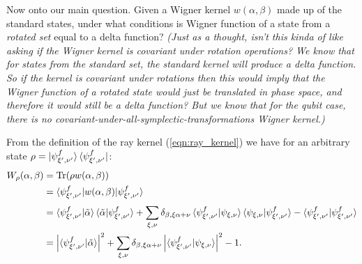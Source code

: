 \documentclass[a4paper]{article}
\DeclareMathOperator{\Tr}{Tr}
\begin{document}
  Now onto our main question. Given a Wigner kernel
  $w(\alpha,\beta)$ made up of the standard states, under
  what conditions is Wigner function of a state from a
  \textit{rotated set} equal to a delta function?
  \textit{(Just as a thought, isn't this kinda of like
    asking if the Wigner kernel is covariant under rotation
    operations? We know that for states from the standard
    set, the standard kernel will produce a delta function.
    So if the kernel is covariant under rotations then this
    would imply that the Wigner function of a rotated state
    would just be translated in phase space, and therefore
    it would still be a delta function? But we know that for
    the qubit case, there is no
  covariant-under-all-symplectic-transformations
  Wigner kernel.)}

  From the definition of the ray kernel
  (\ref{eqn:ray_kernel}) we have for an arbitrary state
  $\rho = \ket{\psi_{\xi',\nu'}^f}
  \bra{\psi_{\xi',\nu'}^f}$:
  \begin{align}
    W_\rho(\alpha,\beta)
    &= \Tr(\rho w(\alpha,\beta)) \\
    &=
    \braket{
      \psi_{\xi',\nu'}^f|w(\alpha,\beta)|\psi_{\xi',\nu'}^f
    } \\
    &= \braket{\psi_{\xi',\nu'}^f|\tilde\alpha}
    \braket{\tilde\alpha|\psi_{\xi',\nu'}^f} 
    + \sum_{\xi,\nu}^{} \delta_{\beta,\xi\alpha+\nu}
    \braket{\psi_{\xi',\nu'}^f|\psi_{\xi,\nu}}
    \braket{\psi_{\xi,\nu}|\psi_{\xi',\nu'}^f}
    - \braket{\psi_{\xi',\nu'}^f|\psi_{\xi',\nu'}^f} \\
    &= \left|\braket{\psi_{\xi',\nu'}^f|\tilde\alpha}\right|^2
    + \sum_{\xi,\nu}^{} \delta_{\beta,\xi\alpha+\nu}
    \left|\braket{\psi_{\xi',\nu'}^f|\psi_{\xi,\nu}}\right|^2
    - 1.
  \end{align}
\end{document}
